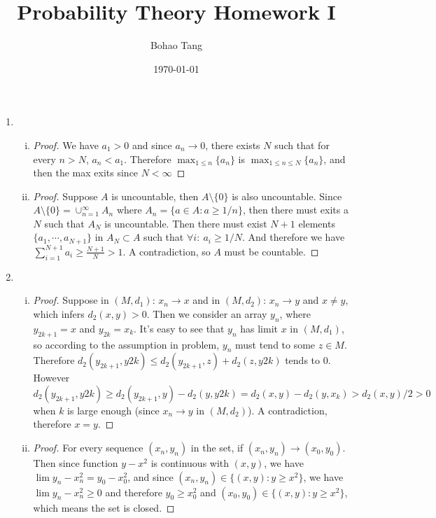 \documentclass[11pt]{article}
\title{Probability Theory Homework I}
\author{Bohao Tang}
\date{\today}
\begin{document}
\maketitle

\begin{enumerate}[1]
	\item
	\begin{enumerate}[(i)]
		\item 
		\begin{proof}
		We have $a_1 > 0$ and since $a_n \to 0$, there exists $N$ such that for every $n > N$,
		$a_n < a_1$. Therefore $\max_{1 \le n} \{a_n\}$ is $\max_{1 \le n \le N} \{a_n\}$, and
		then the max exits since $N < \infty$ 
		\end{proof}
		\item
		\begin{proof}
		Suppose $A$ is uncountable, then $A \setminus \{0\}$ is also uncountable. Since
		$A \setminus \{0\} = \cup_{n=1}^{\infty} A_n$ where $A_n = \{a \in A: a \ge 1/n \}$,
		then there must exits a $N$ such that $A_N$ is uncountable. Then there must exist $N+1$
		elements $\{a_1,\cdots,a_{N+1}\}$ in $A_N \subset A$ such that $\forall i: \  a_i \ge 1/N$.
		And therefore we have $\sum_{i=1}^{N+1} a_i \ge \frac{N+1}{N} > 1$. A contradiction, so $A$
		must be countable.	
		\end{proof}
	\end{enumerate}
	\item
	\begin{enumerate}[(i)]
		\item 
		\begin{proof}
			Suppose in $(M,d_1)$: $x_n \to x$ and in $(M,d_2)$: $x_n \to y$ and $x \ne y$,
			which infers $d_2(x,y) > 0$.
			Then we consider an array $y_n$, where $y_{2k+1} = x$ and $y_{2k} = x_k$.
			It's easy to see that $y_n$ has limit $x$ in $(M,d_1)$, so according to the assumption
			in problem, $y_n$ must tend to some $z \in M$.
			Therefore $d_2(y_{2k+1}, y{2k}) \le d_2(y_{2k+1}, z) + d_2(z, y{2k})$ tends to $0$.
			However $d_2(y_{2k+1}, y{2k}) \ge d_2(y_{2k+1}, y) - d_2(y, y{2k}) = d_2(x,y) - d_2(y,x_k) > d_2(x,y)/2 > 0$ when $k$ is large enough (since $x_n \to y$ in $(M,d_2)$).
			A contradiction, therefore $x = y$.
		\end{proof}
		\item
		\begin{proof}
			For every sequence $(x_n, y_n)$ in the set, if $(x_n, y_n) \to (x_0, y_0)$. Then since
			function $y - x^2$ is continuous with $(x,y)$, we have $\lim y_n - x_n^2 = y_0 - x_0^2$, and since $(x_n,y_n) \in \{(x,y): y \ge x^2 \}$, we have $\lim y_n - x_n^2 \ge 0$ and therefore $y_0 \ge x_0^2$ and $(x_0,y_0) \in \{(x,y): y \ge x^2 \}$, which means the set is closed.

\end{proof}
\end{enumerate}
\end{enumerate}
\end{document}
